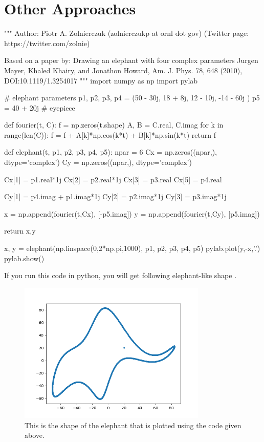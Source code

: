 \documentclass[]{article}
\begin{document}
\newpage

\section{Other Approaches}

\begin{python}

"""
Author: Piotr A. Zolnierczuk (zolnierczukp at ornl dot gov)
(Twitter page: https://twitter.com/zolnie)

Based on a paper by:
Drawing an elephant with four complex parameters
Jurgen Mayer, Khaled Khairy, and Jonathon Howard,
Am. J. Phys. 78, 648 (2010), DOI:10.1119/1.3254017
"""
import numpy as np
import pylab

# elephant parameters
p1, p2, p3, p4 = (50 - 30j, 18 +  8j, 12 - 10j, -14 - 60j )
p5 = 40 + 20j # eyepiece

def fourier(t, C):
    f = np.zeros(t.shape)
    A, B = C.real, C.imag
    for k in range(len(C)):
        f = f + A[k]*np.cos(k*t) + B[k]*np.sin(k*t)
    return f

def elephant(t, p1, p2, p3, p4, p5):
    npar = 6
    Cx = np.zeros((npar,), dtype='complex')
    Cy = np.zeros((npar,), dtype='complex')

    Cx[1] = p1.real*1j
    Cx[2] = p2.real*1j
    Cx[3] = p3.real
    Cx[5] = p4.real

    Cy[1] = p4.imag + p1.imag*1j
    Cy[2] = p2.imag*1j
    Cy[3] = p3.imag*1j

    x = np.append(fourier(t,Cx), [-p5.imag])
    y = np.append(fourier(t,Cy), [p5.imag])

    return x,y

x, y = elephant(np.linspace(0,2*np.pi,1000), p1, p2, p3, p4, p5)
pylab.plot(y,-x,'.')
pylab.show()

\end{python}

If you run this code in python, you will get following elephant-like shape .


\begin{figure}
\label{fig:elephant}
\centering
\includegraphics[width=0.8\textwidth,natwidth=610,natheight=642]{elephant.png}

\caption{This is the shape of the elephant that is plotted using the code given above.}
\end{figure}
\end{document}
